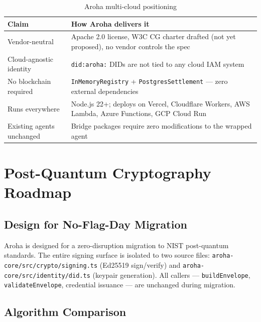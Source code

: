 \documentclass[11pt,a4paper]{article}
\begin{document}
\begin{table}[ht]
  \centering
  \renewcommand{\arraystretch}{1.4}
  \begin{tabularx}{\textwidth}{@{} l X @{}}
    \toprule
    \textbf{Claim} & \textbf{How Aroha delivers it} \\
    \midrule
    Vendor-neutral
      & Apache 2.0 license, W3C CG charter drafted (not yet proposed), no vendor controls the spec \\
    Cloud-agnostic identity
      & \texttt{did:aroha:} DIDs are not tied to any cloud IAM system \\
    No blockchain required
      & \texttt{InMemoryRegistry} + \texttt{PostgresSettlement} --- zero
        external dependencies \\
    Runs everywhere
      & Node.js 22+; deploys on Vercel, Cloudflare Workers, AWS Lambda,
        Azure Functions, GCP Cloud Run \\
    Existing agents unchanged
      & Bridge packages require zero modifications to the wrapped agent \\
    \bottomrule
  \end{tabularx}
  \caption{Aroha multi-cloud positioning}
\end{table}

\section{Post-Quantum Cryptography Roadmap}

\subsection{Design for No-Flag-Day Migration}

Aroha is designed for a zero-disruption migration to NIST post-quantum standards.
The entire signing surface is isolated to two source files:
\texttt{aroha-core/src/crypto/signing.ts} (Ed25519 sign/verify) and
\texttt{aroha-core/src/identity/did.ts} (keypair generation). All callers ---
\texttt{buildEnvelope}, \texttt{validateEnvelope}, credential issuance ---
are unchanged during migration.

\subsection{Algorithm Comparison}
\end{document}
